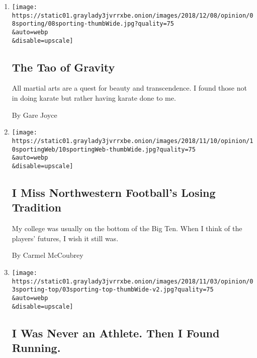 \begin{enumerate}
\def\labelenumi{\arabic{enumi}.}
\item
  \href{/2018/12/08/opinion/karate-martial-arts-tao-gravity-.html}{}

  \texttt{[image: https://static01.graylady3jvrrxbe.onion/images/2018/12/08/opinion/08sporting/08sporting-thumbWide.jpg?quality=75\\\&auto=webp\\\&disable=upscale]}

  \hypertarget{the-tao-of-gravity}{%
  \subsection{The Tao of Gravity}\label{the-tao-of-gravity}}

  All martial arts are a quest for beauty and transcendence. I found
  those not in doing karate but rather having karate done to me.

  By Gare Joyce
\item
  \href{/2018/11/10/opinion/northwestern-football-big-ten-concussions.html}{}

  \texttt{[image: https://static01.graylady3jvrrxbe.onion/images/2018/11/10/opinion/10sportingWeb/10sportingWeb-thumbWide.jpg?quality=75\\\&auto=webp\\\&disable=upscale]}

  \hypertarget{i-miss-northwestern-footballs-losing-tradition}{%
  \subsection{I Miss Northwestern Football's Losing
  Tradition}\label{i-miss-northwestern-footballs-losing-tradition}}

  My college was usually on the bottom of the Big Ten. When I think of
  the players' futures, I wish it still was.

  By Carmel McCoubrey
\item
  \href{/2018/11/02/opinion/running-marathons-sports.html}{}

  \texttt{[image: https://static01.graylady3jvrrxbe.onion/images/2018/11/03/opinion/03sporting-top/03sporting-top-thumbWide-v2.jpg?quality=75\\\&auto=webp\\\&disable=upscale]}

  \hypertarget{i-was-never-an-athlete-then-i-found-running}{%
  \subsection{I Was Never an Athlete. Then I Found
  Running.}\label{i-was-never-an-athlete-then-i-found-running}}


\end{enumerate}
